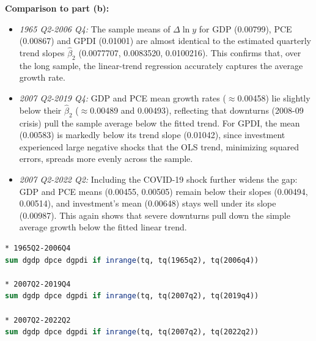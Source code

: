 \documentclass[a4paper,12pt]{article} %
\theoremstyle{nonitalic}
\newenvironment{solution}[1]
  {\renewcommand\theinnercustomsol{#1}%
   \innercustomsol}
  {\endinnercustomsol}
\newcounter{solutionctr}[section]
\renewcommand{\thesolutionctr}{(\alph{solutionctr})}
\newenvironment{autosolution}
  {\refstepcounter{solutionctr}%
   \begin{solution}{\thesolutionctr}}
  {\end{solution}}
\begin{document}
\begin{autosolution}
    \textbf{Comparison to part (b):}
    \begin{itemize}
        \item \emph{1965 Q2-2006 Q4:} The sample means of $\Delta\ln y$ for GDP (0.00799), PCE (0.00867) and GPDI (0.01001) are almost identical to the estimated quarterly trend slopes $\hat\beta_2$ (0.0077707, 0.0083520, 0.0100216). 
        This confirms that, over the long sample, the linear-trend regression accurately captures the average growth rate.
        \item \emph{2007 Q2-2019 Q4:} GDP and PCE mean growth rates ($\approx$0.00458) lie slightly below their $\hat\beta_2$ ($\approx$0.00489 and 0.00493), reflecting that downturns (2008-09 crisis) pull the sample average below the fitted trend. 
        For GPDI, the mean (0.00583) is markedly below its trend slope (0.01042), since investment experienced large negative shocks that the OLS trend, minimizing squared errors, spreads more evenly across the sample.
        \item \emph{2007 Q2-2022 Q2:} Including the COVID-19 shock further widens the gap: GDP and PCE means (0.00455, 0.00505) remain below their slopes (0.00494, 0.00514), and investment's mean (0.00648) stays well under its slope (0.00987). 
        This again shows that severe downturns pull down the simple average growth below the fitted linear trend.
    \end{itemize}
    \begin{lstlisting}[language=Stata]
* 1965Q2-2006Q4
sum dgdp dpce dgpdi if inrange(tq, tq(1965q2), tq(2006q4))

* 2007Q2-2019Q4
sum dgdp dpce dgpdi if inrange(tq, tq(2007q2), tq(2019q4))

* 2007Q2-2022Q2
sum dgdp dpce dgpdi if inrange(tq, tq(2007q2), tq(2022q2))
    \end{lstlisting}
\end{autosolution}
\end{document}
